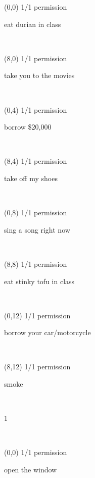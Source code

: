 \documentclass[a4paper]{article}
\newcommand{\mycard}[5]{%
	\vspace{0.1cm}
	\small #1 #2
	\par
	\parbox[t][6.7cm][c]{9.5cm}{%
	\hspace{0.1cm} \Large#3\\
	\normalsize#4 #5
	}
}
\begin{document}
\selectfont

\begin{textblock}{8}(0,0)
\mycard{1/1}{permission}{\parbox{9.0cm}{
eat durian in class
}}{}{} 
\end{textblock}

\begin{textblock}{8}(8,0)
\mycard{1/1}{permission}{\parbox{9.0cm}{
take you to the movies
}}{}{} 
\end{textblock}

\begin{textblock}{8}(0,4)
\mycard{1/1}{permission}{\parbox{9.0cm}{
borrow \$20,000
}}{}{} 
\end{textblock}

\begin{textblock}{8}(8,4)
\mycard{1/1}{permission}{\parbox{9.0cm}{
take off my shoes
}}{}{} 
\end{textblock}

\begin{textblock}{8}(0,8)
\mycard{1/1}{permission}{\parbox{9.0cm}{
sing a song right now
}}{}{} 
\end{textblock}

\begin{textblock}{8}(8,8)
\mycard{1/1}{permission}{\parbox{9.0cm}{
eat stinky tofu in class
}}{}{} 
\end{textblock}

\begin{textblock}{8}(0,12)
\mycard{1/1}{permission}{\parbox{9.0cm}{
borrow your car/motorcycle
}}{}{} 
\end{textblock}

\begin{textblock}{8}(8,12)
\mycard{1/1}{permission}{\parbox{9.0cm}{
smoke
}}{}{} 
\end{textblock}

\begin{tiny}1\end{tiny}\\
\newpage

\begin{textblock}{8}(0,0)
\mycard{1/1}{permission}{\parbox{9.0cm}{
open the window
}}{}{} 
\end{textblock}
\end{document}

